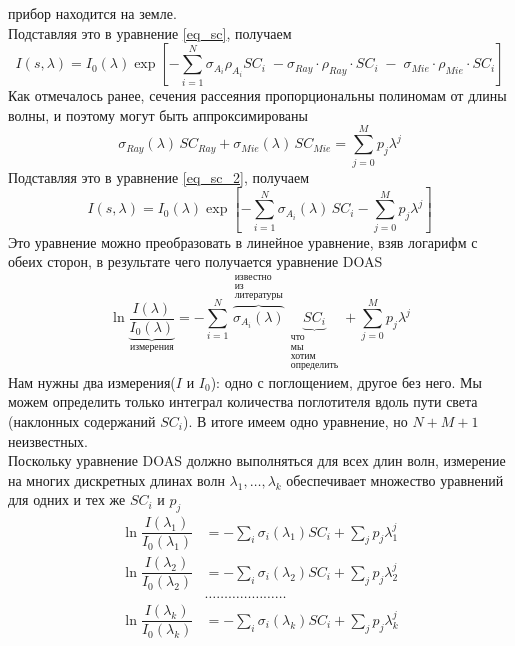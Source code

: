 \documentclass[a4paper,14pt]{article}
\theoremstyle{plain}
\theoremstyle{definition}
\theoremstyle{remark}
\newcommand{\nl}{\\ \indent}
\begin{document}
прибор находится на земле.
\nl
Подставляя это в уравнение \eqref{eq_sc}, получаем
\begin{equation}
I(s, \lambda) =
I_0(\lambda) \exp 
\left[
-\sum_{i=1}^N\sigma_{A_i} \rho_{A_i} SC_i \;
- \sigma_{Ray} \cdot
\rho_{Ray} \cdot
SC_i \;
- \;
\sigma_{Mie} \cdot \rho_{Mie} \cdot SC_i 
\right]
\label{eq_sc_2}
\end{equation}
Как отмечалось ранее, сечения рассеяния пропорциональны полиномам
от длины волны, и поэтому могут быть аппроксимированы
\begin{equation}
\sigma_{Ray}(\lambda) \, SC_{Ray} +
\sigma_{Mie}(\lambda) \, SC_{Mie} =
\sum_{j=0}^{M} p_j \lambda^j   
\end{equation}
Подставляя это в уравнение \eqref{eq_sc_2}, получаем
\begin{equation}
I(s, \lambda) =
I_0(\lambda)
\exp
\left[
-\sum_{i=1}^N
\sigma_{A_i}(\lambda) \,
SC_i
- \sum_{j=0}^M
p_j \lambda^j
\right]
\end{equation}
Это уравнение можно преобразовать в линейное уравнение, 
взяв логарифм с обеих сторон, в результате чего получается
уравнение DOAS
\begin{equation}
\ln\underbrace{\dfrac{I(\lambda)}{I_0(\lambda)}}_{
\text{измерения}
} =
- \sum_{i=1}^N 
\overbrace{\sigma_{A_i}(\lambda)}^{
\substack{\text{известно} \\
\text{из} \\
\text{литературы}}}
\underbrace{SC_i}_{
\substack{
\text{что} \\
\text{мы} \\
\text{хотим} \\
\text{определить}
}
} +
\sum_{j=0}^{M} p_j \lambda^j
\end{equation}
Нам нужны два измерения($I$ и $I_0$): 
одно с поглощением, другое без него. 
Мы можем определить только интеграл количества поглотителя 
вдоль пути света (наклонных содержаний $SC_i$). 
В итоге имеем одно уравнение, но $N + M + 1$ неизвестных.
\nl
Поскольку уравнение DOAS должно выполняться для всех длин волн,
измерение на многих дискретных длинах волн 
$\lambda_1, \ldots, \lambda_k$  обеспечивает множество 
уравнений для одних и тех же $SC_i$ и $p_j$
\begin{equation}
\begin{split}
\ln \dfrac{I(\lambda_1)}{I_0(\lambda_1)} &=
- \sum_i \sigma_i(\lambda_1) SC_i +
\sum_{j} p_j \lambda_1^j \\
\ln \dfrac{I(\lambda_2)}{I_0(\lambda_2)} &=
- \sum_i \sigma_i(\lambda_2) SC_i +
\sum_{j} p_j \lambda_2^j \\
&\ldots \ldots \ldots \ldots \ldots \ldots \ldots \\
\ln \dfrac{I(\lambda_k)}{I_0(\lambda_k)} &=
- \sum_i \sigma_i(\lambda_k) SC_i +
\sum_{j} p_j \lambda_k^j
\end{split}
\end{equation}
\end{document}
